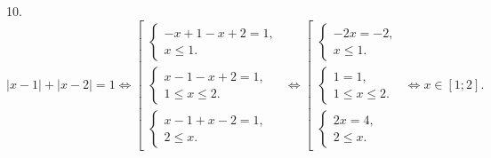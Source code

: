 10. $|x-1|+|x-2|=1\Leftrightarrow \left[\begin{array}{l}\begin{cases} -x+1-x+2=1,\\ x\leqslant 1.\end{cases}\\
\begin{cases} x-1-x+2=1,\\ 1\leqslant x\leqslant 2 .\end{cases}\\\begin{cases} x-1+x-2=1,\\ 2\leqslant x.\end{cases}\end{array}\right.\Leftrightarrow
\left[\begin{array}{l}\begin{cases} -2x=-2,\\ x\leqslant 1.\end{cases}\\
\begin{cases} 1=1,\\ 1\leqslant x\leqslant 2 .\end{cases}\\\begin{cases} 2x=4,\\ 2\leqslant x.\end{cases}\end{array}\right.\Leftrightarrow
x\in [1;2].$\\
